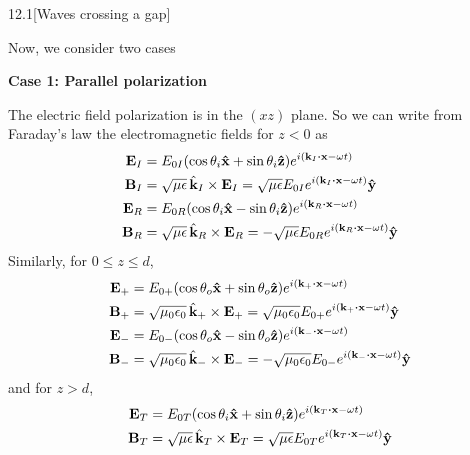 \documentclass[12pt]{article}
\begin{document}
\begin{problem}{12.1}[Waves crossing a gap]
\begin{solution}
Now, we consider two cases
\begin{center}
\textbf{Case 1: Parallel polarization}
\end{center}

The electric field polarization is in the $(xz)$ plane. So we can write from
Faraday's law the electromagnetic fields for $z<0$ as
\begin{subequations}
    \begin{align}
        \vb{E}_I&=E_{0I}
        \qty(\cos\theta_i\xhat+\sin\theta_i\zhat)
        e^{i(\vb{k}_I\vdot\vb{x}-\omega t)}\\
        \vb{B}_I&=\sqrt{\mu\epsilon}\,\hat{\vb{k}}_I\times\vb{E}_I
        =\sqrt{\mu\epsilon}E_{0I}e^{i(\vb{k}_I\vdot\vb{x}-\omega t)}\yhat\\
        \vb{E}_R&=E_{0R}
        \qty(\cos\theta_i\xhat-\sin\theta_i\zhat)
        e^{i(\vb{k}_R\vdot\vb{x}-\omega t)}\\
        \vb{B}_R&=\sqrt{\mu\epsilon}\,\hat{\vb{k}}_R\times\vb{E}_R
        =-\sqrt{\mu\epsilon}E_{0R}e^{i(\vb{k}_R\vdot\vb{x}-\omega t)}\yhat
    \end{align} 
\end{subequations}
Similarly, for $0\leq z\leq d$,
\begin{subequations}
    \begin{align}
        \vb{E}_+&=E_{0+}
        \qty(\cos\theta_o\xhat+\sin\theta_o\zhat)
        e^{i(\vb{k}_+\vdot\vb{x}-\omega t)}\\
        \vb{B}_+&=\sqrt{\mu_0\epsilon_0}\,\hat{\vb{k}}_+\times\vb{E}_+
        =\sqrt{\mu_0\epsilon_0}E_{0+}e^{i(\vb{k}_+\vdot\vb{x}-\omega t)}\yhat\\
        \vb{E}_-&=E_{0-}
        \qty(\cos\theta_o\xhat-\sin\theta_o\zhat)
        e^{i(\vb{k}_-\vdot\vb{x}-\omega t)}\\
        \vb{B}_-&=\sqrt{\mu_0\epsilon_0}\,\hat{\vb{k}}_-\times\vb{E}_-
        =-\sqrt{\mu_0\epsilon_0}E_{0-}e^{i(\vb{k}_-\vdot\vb{x}-\omega t)}\yhat
    \end{align} 
\end{subequations}
and for $z>d$,
\begin{subequations}
    \begin{align}
        \vb{E}_T&=E_{0T}
        \qty(\cos\theta_i\xhat+\sin\theta_i\zhat)
        e^{i(\vb{k}_T\vdot\vb{x}-\omega t)}\\
        \vb{B}_T&=\sqrt{\mu\epsilon}\,\hat{\vb{k}}_T\times\vb{E}_T
        =\sqrt{\mu\epsilon}E_{0T}e^{i(\vb{k}_T\vdot\vb{x}-\omega t)}\yhat
    \end{align} 

\end{subequations}
\end{solution}
\end{problem}
\end{document}
